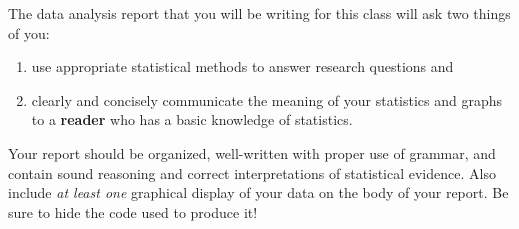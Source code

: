 \documentclass[
]{book}
\providecommand{\tightlist}{%
  \setlength{\itemsep}{0pt}\setlength{\parskip}{0pt}}
\begin{document}
The data analysis report that you will be writing for this class will ask two things of you:

\begin{enumerate}
\def\labelenumi{\arabic{enumi}.}
\tightlist
\item
  use appropriate statistical methods to answer research questions and
\item
  clearly and concisely communicate the meaning of your statistics and graphs to a \textbf{reader} who has a basic knowledge of statistics.
\end{enumerate}

Your report should be organized, well-written with proper use of grammar, and contain sound reasoning and correct interpretations of statistical evidence. Also include \emph{at least one} graphical display of your data on the body of your report. Be sure to hide the code used to produce it!
\end{document}
